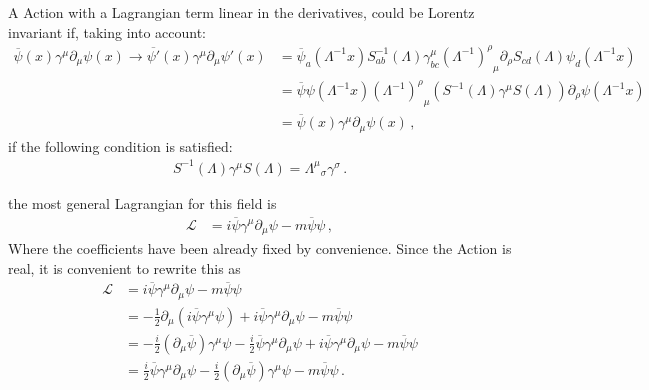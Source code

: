 A Action with a Lagrangian term linear in the derivatives, could be Lorentz invariant if, taking into account:
 \begin{align}
   \overline{\psi}(x)\gamma^\mu\partial_\mu\psi(x)\to  \overline{\psi'}(x)\gamma^\mu\partial_\mu\psi'(x)&=
 \overline{\psi}_a\left(\Lambda^{-1}x\right)S^{-1}_{ab}(\Lambda)\gamma^\mu_{bc}{\left(\Lambda^{-1}\right)^\rho}_\mu\partial_\rho S_{cd}(\Lambda)\psi_d\left(\Lambda^{-1}x\right)\nonumber\\
   &=
\overline{\psi} \psi\left(\Lambda^{-1}x\right){\left(\Lambda^{-1}\right)^\rho}_\mu \left(S^{-1}(\Lambda)\gamma^\mu S(\Lambda)\right)\partial_\rho\psi\left(\Lambda^{-1}x\right)\nonumber\\
&=\overline{\psi}(x)\gamma^\mu\partial_\mu\psi(x)\,,
 \end{align}
if the following condition is satisfied:
\begin{align}
\label{eq:ltrincond}
  S^{-1}(\Lambda)\gamma^\mu S(\Lambda)={\Lambda^\mu}_\sigma\gamma^\sigma\,.
\end{align}




the most general Lagrangian for this field is
\begin{align}
   \mathcal{L}&=i \overline{\psi} \gamma^\mu\partial_\mu\psi-m\overline{\psi} \psi\,,
\end{align}
Where the coefficients have been already fixed by convenience. Since the Action is real, it is convenient to rewrite this as
\begin{align}
   \mathcal{L}&=i \overline{\psi} \gamma^\mu\partial_\mu\psi-m\overline{\psi} \psi\nonumber\\
&=-\frac{1}{2}\partial_\mu\left(i \overline{\psi} \gamma^\mu\psi\right)+i \overline{\psi} \gamma^\mu\partial_\mu\psi-m\overline{\psi} \psi\nonumber\\
  &=-\frac{i}{2}(\partial_\mu \overline{\psi}) \gamma^\mu\psi-\frac{i}{2} \overline{\psi} \gamma^\mu\partial_\mu\psi+i \overline{\psi} \gamma^\mu\partial_\mu\psi-m\overline{\psi} \psi\nonumber\\
  &=\frac{i}{2} \overline{\psi} \gamma^\mu\partial_\mu\psi-\frac{i}{2}(\partial_\mu \overline{\psi}) \gamma^\mu\psi-m\overline{\psi} \psi\,.
\end{align}
 
